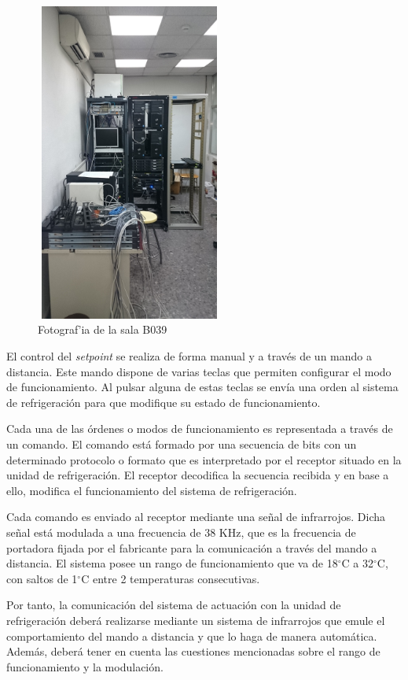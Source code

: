\begin{figure}[h]
\centering
\includegraphics[width=0.55\textwidth,height=105mm]{imagenes/capitulo3/bancoPruebas2}
\caption {Fotograf'ia de la sala B039}
\label{fig3_1:sala}
\end{figure}

	El control del \textit{setpoint} se realiza de forma manual y a través de un mando a distancia. Este mando dispone de varias teclas que permiten configurar el modo de funcionamiento. Al pulsar alguna de estas teclas se envía una orden al sistema de refrigeración para que modifique su estado de funcionamiento.

	Cada una de las órdenes o modos de funcionamiento es representada a través de un comando. El comando está formado por una secuencia de bits con un determinado protocolo o formato que es interpretado por el receptor situado en la unidad de refrigeración. El receptor decodifica la secuencia recibida y en base a ello, modifica el funcionamiento del sistema de refrigeración.

	Cada comando es enviado al receptor mediante una señal de infrarrojos. Dicha señal está modulada a una frecuencia de 38 KHz, que es la frecuencia de portadora fijada por el fabricante para la comunicación a través del mando a distancia. El sistema posee un rango de funcionamiento que va de 18{$^\circ$}C a 32{$^\circ$}C, con saltos de 1{$^\circ$}C entre 2 temperaturas consecutivas. 

	Por tanto, la comunicación del sistema de actuación con la unidad de refrigeración deberá realizarse mediante un sistema de infrarrojos que emule el comportamiento del mando a distancia y que lo haga de manera automática. Además, deberá tener en cuenta las cuestiones mencionadas sobre el rango de funcionamiento y la modulación.






